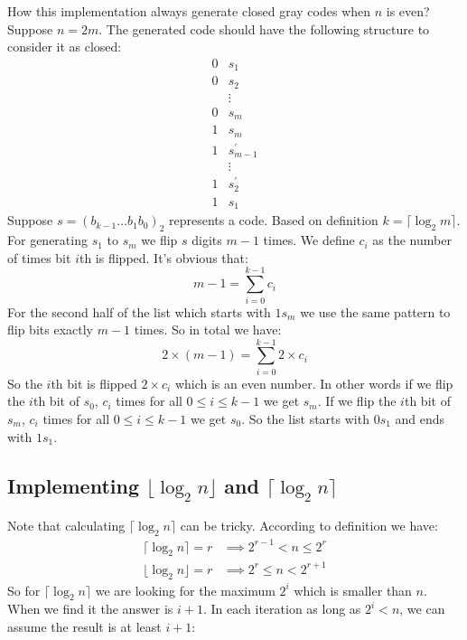 \documentclass{book}
\begin{document}
	How this implementation always generate closed gray codes when $n$ is even? Suppose $n = 2m$. The generated code should have the following structure to consider it as closed:
	\begin{equation*}
		\begin{split}
		0&s_1 \\
		0&s_2 \\
		&\vdots \\
		0&s_m \\ 
		1&s_m \\
		1&s_{m - 1}^{\prime} \\
		&\vdots \\		
		1&s_2^{\prime} \\
		1&s_1
		\end{split}
	\end{equation*}
	Suppose $s = (b_{k - 1} \dots b_1 b_0)_2$ represents a code. Based on definition $k = \lceil \log_2{m} \rceil$. For generating $s_1$ to $s_m$ we flip $s$ digits $m - 1$ times. We define $c_i$ as the number of times bit $i$th is flipped. It's obvious that:
	\begin{equation*}
		m - 1 = \sum_{i = 0}^{k - 1}{c_i}
	\end{equation*}
	For the second half of the list which starts with $1s_m$ we use the same pattern to flip bits exactly $m - 1$ times. So in total we have:
	\begin{equation*}
		2 \times (m - 1) = \sum_{i = 0}^{k - 1}{2 \times c_i}
	\end{equation*}
	So the $i$th bit is flipped $2 \times c_i$ which is an even number. In other words if we flip the $i$th bit of $s_0$, $c_i$ times for all $0 \le i \le k - 1$ we get $s_m$. If we flip the $i$th bit of $s_m$, $c_i$ times for all $0 \le i \le k - 1$ we get $s_0$. So the list starts with $0s_1$ and ends with $1s_1$.
	\subsection{Implementing $\lfloor \log_2{n} \rfloor$ and $\lceil \log_2{n} \rceil$}
	\par Note that calculating $\lceil \log_2{n} \rceil$ can be tricky. According to definition we have:
	\begin{equation*}
		\begin{split}
			\lceil \log_2{n} \rceil = r &\implies 2^{r - 1} < n \le 2^r \\
			\lfloor \log_2{n} \rfloor = r &\implies 2^r \le n < 2^{r + 1}			
		\end{split}
	\end{equation*}
	So for $\lceil \log_2{n} \rceil$ we are looking for the maximum $2^i$ which is smaller than $n$. When we find it the answer is $i + 1$. In each iteration as long as $2^i < n$, we can assume the result is at least $i + 1$:
	
\end{document}
